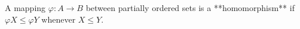 A mapping $\varphi: A \to B$ between partially ordered sets is a **homomorphism** if $\varphi X \leq \varphi Y$ whenever $X \leq Y$.
